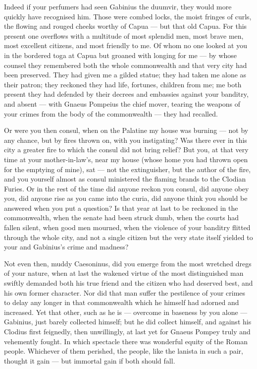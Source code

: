  Indeed if your perfumers had seen Gabinius the duumvir, they would more quickly have recognised him. Those were combed locks, the moist fringes of curls, the flowing and rouged cheeks worthy of Capua — but that old Capua. For this present one overflows with a multitude of most splendid men, most brave men, most excellent citizens, and most friendly to me. Of whom no one looked at you in the bordered toga at Capua but groaned with longing for me — by whose counsel they remembered both the whole commonwealth and that very city had been preserved. They had given me a gilded statue; they had taken me alone as their patron; they reckoned they had life, fortunes, children from me; me both present they had defended by their decrees and embassies against your banditry, and absent — with Gnaeus Pompeius the chief mover, tearing the weapons of your crimes from the body of the commonwealth — they had recalled.

 Or were you then consul, when on the Palatine my house was burning — not by any chance, but by fires thrown on, with you instigating? Was there ever in this city a greater fire to which the consul did not bring relief? But you, at that very time at your mother-in-law's, near my house (whose home you had thrown open for the emptying of mine), sat — not the extinguisher, but the author of the fire, and you yourself almost as consul ministered the flaming brands to the Clodian Furies. Or in the rest of the time did anyone reckon you consul, did anyone obey you, did anyone rise as you came into the curia, did anyone think you should be answered when you put a question? Is that year at last to be reckoned in the commonwealth, when the senate had been struck dumb, when the courts had fallen silent, when good men mourned, when the violence of your banditry flitted through the whole city, and not a single citizen but the very state itself yielded to your and Gabinius's crime and madness?

 Not even then, muddy Caesoninus, did you emerge from the most wretched dregs of your nature, when at last the wakened virtue of the most distinguished man swiftly demanded both his true friend and the citizen who had deserved best, and his own former character. Nor did that man suffer the pestilence of your crimes to delay any longer in that commonwealth which he himself had adorned and increased. Yet that other, such as he is — overcome in baseness by you alone — Gabinius, just barely collected himself; but he did collect himself, and against his Clodius first feignedly, then unwillingly, at last yet for Gnaeus Pompey truly and vehemently fought. In which spectacle there was wonderful equity of the Roman people. Whichever of them perished, the people, like the lanista in such a pair, thought it gain — but immortal gain if both should fall.

